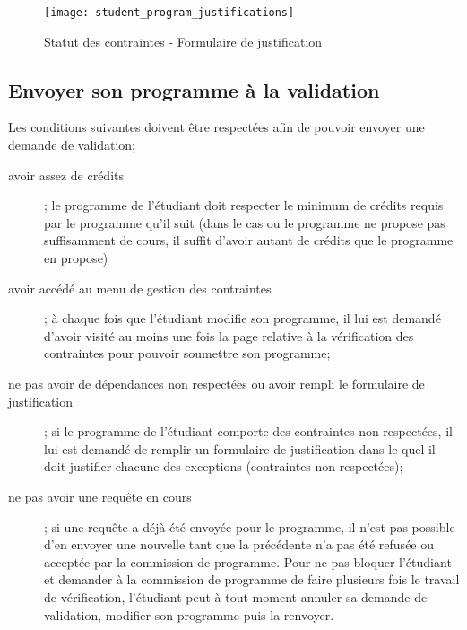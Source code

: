 \begin{figure}[htb]
\centering
\caption{Statut des contraintes - Formulaire de justification}
\label{fig:student_program_justifications}
\texttt{[image: student\_program\_justifications]}
\end{figure}

\subsection{Envoyer son programme à la validation}

Les conditions suivantes doivent être respectées afin de pouvoir envoyer une demande de validation;
\begin{description}
  \item[avoir assez de crédits] ; le programme de l'étudiant doit respecter le minimum de crédits requis par le programme qu'il suit (dans le cas ou le programme ne propose pas suffisamment de cours, il suffit d'avoir autant de crédits que le programme en propose)
  \item[avoir accédé au menu de gestion des contraintes] ; à chaque fois que l'étudiant modifie son programme, il lui est demandé d'avoir visité au moins une fois la page relative à la vérification des contraintes pour pouvoir soumettre son programme;
  \item[ne pas avoir de dépendances non respectées ou avoir rempli le formulaire de justification] ; si le programme de l'étudiant comporte des contraintes non respectées, il lui est demandé de remplir un formulaire de justification dans le quel il doit justifier chacune des exceptions (contraintes non respectées);
  \item[ne pas avoir une requête en cours] ; si une requête a déjà été envoyée pour le programme, il n'est pas possible d'en envoyer une nouvelle tant que la précédente n'a pas été refusée ou acceptée par la commission de programme. Pour ne pas bloquer l'étudiant et demander à la commission de programme de faire plusieurs fois le travail de vérification, l'étudiant peut à tout moment annuler sa demande de validation, modifier son programme puis la renvoyer. 
\end{description} 